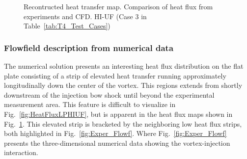 \documentclass{AIAA}
\begin{document}
\begin{figure}[!h]
\center
\begin{adjustbox}{max width=1.1\columnwidth,center}
%
\end{adjustbox}
\caption{Recontructed heat transfer map. Comparison of heat flux from experiments and CFD. HI-UF (Case 3 in Table~\ref{tab:T4_Test_Cases})}
\label{fig:HeatFluxMap}
\end{figure} 


\subsubsection{Flowfield description from numerical data}

The numerical solution presents an interesting heat flux distribution on the flat plate consisting of a strip of elevated heat transfer running approximately longitudinally down the center of the vortex.
This regions extends from shortly downstream of the injection bow shock until beyond the experimental measurement area.
This feature is difficult to visualize in Fig.~\ref{fig:HeatFluxLPHIUF}, but is apparent in the heat flux maps shown in Fig.~\ref{fig:HeatFluxMap}.
This elevated strip is bracketed by the neighboring low heat flux strips, both highlighted in Fig.~\ref{fig:Exper_Flowf}.
Where Fig.~\ref{fig:Exper_Flowf} presents the three-dimensional numerical data showing the vortex-injection interaction. 
\end{document}
